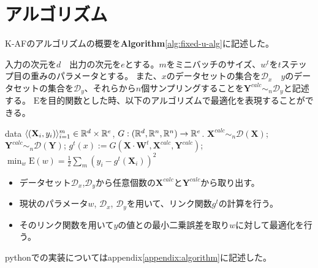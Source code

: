 \section{アルゴリズム}
\label{al}
K-AFのアルゴリズムの概要を{\bf Algorithm}\ref{alg:fixed-u-alg}に記述した。

入力の次元を$ d $　出力の次元を$ e $とする。$ m $をミニバッチのサイズ、$ w^t $を$t$ステップ目の重みのパラメータとする。
また、$x$のデータセットの集合を$ \mathcal{D}_x $　$y$のデータセットの集合を$ \mathcal{D}_y $、それらから$n$個サンプリングすることを$ \mathbf{Y}^{calc} \sim_n \mathcal{D}_y $と記述する。
$ \mathrm{E} $を目的関数とした時、以下のアルゴリズムで最適化を表現することができる。



\begin{algorithm}[]
	\caption{\KAF}
	\label{alg:fixed-u-alg}
\begin{algorithmic}
	 data $\langle (\mathbf{X}_i, y_i) \rangle_{i=1}^m \in
	\mathbb{R}^d \times \mathbb{R}^e$, $G: ( \mathbb{R}^d, \mathbb{R}^n, \mathbb{R}^n ) \rightarrow  \mathbb{R}^e$.
	\STATE $\mathbf{X}^{calc} \sim_n \mathcal{D}(\mathbf{X})$;
    \STATE $\mathbf{Y}^{calc} \sim_n \mathcal{D}(\mathbf{Y})$;
	\STATE $g^t(x) := G(\mathbf{X} \cdot  \mathbf{W}^t, \mathbf{X}^{calc}, \mathbf{Y}^{calc} )$;
	\STATE $ \displaystyle{\min_{w} \mathrm{E}(w)} = \frac{1}{2}\sum_m (y_i - g^t(\mathbf{X}_i))^2 $
	\ENDFOR
\end{algorithmic}
\end{algorithm}

\begin{itemize}
  \item データセット$\mathcal{D}_x$,$\mathcal{D}_y$から任意個数の$ \mathbf{X}^{calc} $と$ \mathbf{Y}^{calc} $から取り出す。
  \item 現状のパラメータ$ w $, $\mathcal{D}_x$, $\mathcal{D}_y$を用いて、リンク関数$ g^t $の計算を行う。
  \item そのリンク関数を用いて$ y $の値との最小二乗誤差を取り$ w $に対して最適化を行う。
\end{itemize}


pythonでの実装についてはappendix\ref{appendix:algorithm}に記述した。






